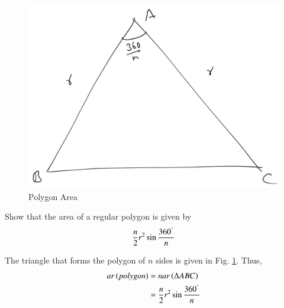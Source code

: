 \begin{figure}[!h]
	\begin{center}
		
		\includegraphics[width=\columnwidth]{./figs/ch5_polygon_area}
		\vspace*{-10cm}
	\end{center}
	\caption{Polygon Area}
	\label{ch5_polygon_area}	
\end{figure}
%
%
\begin{problem}
Show that the area of a regular polygon is given by 
%
\begin{equation}
\frac{n}{2}r^{2}\sin\frac{360^{\degree}}{n}
\end{equation}
%
\end{problem}
\proof The triangle that forms the polygon of $n$ sides is given in Fig. \ref{ch5_polygon_area}.  Thus,
%
\begin{equation}
\begin{split}
ar\left(polygon\right) &= n ar\left(\Delta ABC\right) \\
&= \frac{n}{2}r^{2}\sin\frac{360^{\degree}}{n}
\end{split}
\end{equation}
%
